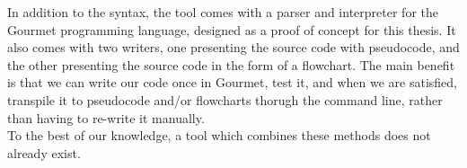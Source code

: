 In addition to the syntax, the tool comes with a parser and interpreter for the Gourmet programming language, designed as a proof of concept for this thesis. It also comes with two writers, one presenting the source code with pseudocode, and the other presenting the source code in the form of a flowchart. The main benefit is that we can write our code once in Gourmet, test it, and when we are satisfied, transpile it to pseudocode and/or flowcharts thorugh the command line, rather than having to re-write it manually. \hfill \\

To the best of our knowledge, a tool which combines these methods does not already exist.